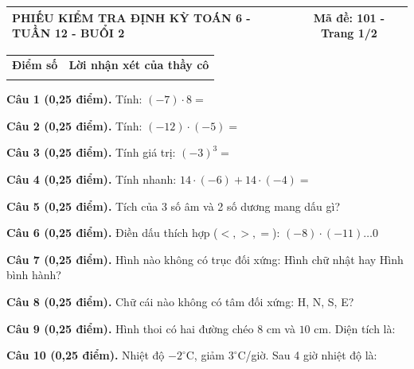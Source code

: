 \documentclass[12pt,a4paper]{article}
\begin{document}
\pagestyle{empty}
\noindent
\begin{tabularx}{\linewidth}{|X|c|}
\hline
\textbf{PHIẾU KIỂM TRA ĐỊNH KỲ TOÁN 6 - TUẦN 12 - BUỔI 2} & \textbf{Mã đề: 101 - Trang 1/2} \\
\hline
\end{tabularx}

\vspace{1.0mm}

\noindent
\begin{tabularx}{\linewidth}{|p{3.2cm}|X|}
\hline
\centering\textbf{Điểm số} & \centering\textbf{Lời nhận xét của thầy cô} \tabularnewline
\rule{0pt}{1.8cm} & \\
\hline
\end{tabularx}

\vspace{1.0mm}
\noindent\textbf{Câu 1 (0,25 điểm).} Tính: $(-7) \cdot 8 =$ \par\vspace{0.25mm}
\noindent\textbf{Câu 2 (0,25 điểm).} Tính: $(-12) \cdot (-5) =$ \par\vspace{0.25mm}
\noindent\textbf{Câu 3 (0,25 điểm).} Tính giá trị: $(-3)^3 =$ \par\vspace{0.25mm}
\noindent\textbf{Câu 4 (0,25 điểm).} Tính nhanh: $14 \cdot (-6) + 14 \cdot (-4) =$ \par\vspace{0.25mm}
\noindent\textbf{Câu 5 (0,25 điểm).} Tích của 3 số âm và 2 số dương mang dấu gì? \par\vspace{0.25mm}
\noindent\textbf{Câu 6 (0,25 điểm).} Điền dấu thích hợp ($<, >, =$): $(-8) \cdot (-11) \dots 0$ \shortans{>}\par\vspace{0.25mm}
\noindent\textbf{Câu 7 (0,25 điểm).} Hình nào không có trục đối xứng: Hình chữ nhật hay Hình bình hành? \par\vspace{0.25mm}
\noindent\textbf{Câu 8 (0,25 điểm).} Chữ cái nào không có tâm đối xứng: H, N, S, E? \par\vspace{0.25mm}
\noindent\textbf{Câu 9 (0,25 điểm).} Hình thoi có hai đường chéo $8\text{ cm}$ và $10\text{ cm}$. Diện tích là: \par\vspace{0.25mm}
\noindent\textbf{Câu 10 (0,25 điểm).} Nhiệt độ $-2^\circ\text{C}$, giảm $3^\circ\text{C}$/giờ. Sau 4 giờ nhiệt độ là: \par\vspace{0.25mm}
\end{document}
